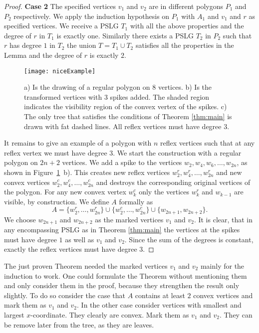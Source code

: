 \documentclass[12pt]{article}
\begin{document}
\begin{proof}
	\textbf{Case 2} The specified vertices $v_1$ and $v_2$ are in different polygons $P_1$ and $P_2$ respectively. We apply the induction hypothesis on $P_1$ with $A_1$ and  $v_1$ and $r$ as specified vertices. We receive a PSLG $T_1$ with all the above properties and the degree of $r$ in $T_1$ is exactly one. Similarly there exists a PSLG $T_2$ in $P_2$ such that $r$ has degree $1$ in $T_2$ the union $T = T_1 \cup T_2$  satisfies all the properties in the Lemma and the degree of $r$ is exactly $2$.
				\begin{figure}[h]
			\begin{center}
			\texttt{[image: niceExample]}
				\caption{a) Is the drawing of a regular polygon on $8$ vertices. b) Is the transformed vertices with $3$ spikes added. The shaded region indicates the visibility region of the convex vertex of the spikes. c) The only tree that satisfies the conditions of Theorem \ref{thm:main} is drawn with fat dashed lines. All reflex vertices must have degree $3$.}
				\label{fig:tightExample}
			\end{center}
	\end{figure} 
	It remains to give an example of a polygon with $n$ reflex vertices such that at any reflex vertex we must have degree $3$. We start the construction with a regular polygon on $2n+2$ vertices. We add a spike to the vertices $w_2, w_4, w_6, \ldots ,w_{2n}$, as shown in Figure~\ref{fig:tightExample}~b).
	This creates new reflex vertices $w^r_2, w^r_4, \ldots ,w^r_{2n}$ and new convex vertices $w^c_2, w^c_4, \ldots ,w^c_{2n}$ and destroys the corresponding original vertices of the polygon. For any new convex vertex $w_k^c$ only the vertices $w_k^r$ and $w_{k-1}$ are visible, by construction. We define $A$ formally as $$ A = \{ w^r_2,  \ldots ,w^r_{2n} \} \cup \{  w^c_2,  \ldots ,w^c_{2n} \} \cup \{w_{2n+1},w_{2n+2}\}.$$
	 We choose  $w_{2n+1}$ and $w_{2n+2}$ as the marked vertices $v_1$ and $v_2$. It is clear, that in any encompassing PSLG as in Theorem \ref{thm:main} the vertices at the spikes must have degree $1$ as well as $v_1$ and $v_2$. Since the sum of the degrees is constant, exactly the reflex vertices must have degree $3$.
\end{proof}

The just proven Theorem needed the marked vertices $v_1$ and $v_2$ mainly for the induction to work. One could formulate the Theorem without mentioning them and only consider them in the proof, because they strengthen the result only slightly. 
To do so consider the case that $A$ contains at least $2$ convex vertices and mark them as $v_1$ and $v_2$. In the other case consider
vertices with smallest and largest $x$-coordinate.  They clearly are convex. Mark them as $v_1$ and $v_2$. They can be remove later from the tree, as they are leaves.
\end{document}
